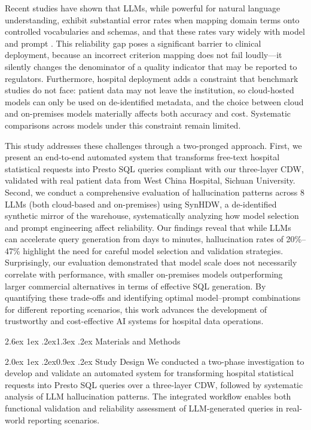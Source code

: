\documentclass[10pt]{article}
\makeatletter
\renewcommand\section{\@startsection{section}{1}{\z@}%
  {2.6ex \@plus 1ex \@minus .2ex}{1.3ex \@plus .2ex}%
  {\normalfont\large\bfseries}}
\renewcommand\subsection{\@startsection{subsection}{2}{\z@}%
  {2.0ex \@plus 1ex \@minus .2ex}{0.9ex \@plus .2ex}%
  {\normalfont\normalsize\bfseries}}
\makeatother
\begin{document}
Recent studies have shown that LLMs, while powerful for natural language
understanding, exhibit substantial error rates when mapping domain terms onto
controlled vocabularies and schemas, and that these rates vary widely with model
and prompt \cite{halluc2024,ragstruct2024,chang2024}. This reliability gap poses a significant barrier to
clinical deployment, because an incorrect criterion mapping does not fail
loudly---it silently changes the denominator of a quality indicator that may be
reported to regulators. Furthermore, hospital deployment adds a constraint that
benchmark studies do not face: patient data may not leave the institution, so
cloud-hosted models can only be used on de-identified metadata, and the choice
between cloud and on-premises models materially affects both accuracy and cost.
Systematic comparisons across models under this constraint remain limited.

This study addresses these challenges through a two-pronged approach. First, we
present an end-to-end automated system that transforms free-text hospital
statistical requests into Presto SQL queries compliant with our three-layer CDW,
validated with real patient data from West China Hospital, Sichuan University. Second, we conduct a
comprehensive evaluation of hallucination patterns across 8 LLMs (both
cloud-based and on-premises) using SynHDW, a de-identified synthetic mirror of
the warehouse, systematically analyzing how model selection and prompt
engineering affect reliability. Our findings reveal that while LLMs can
accelerate query generation from days to minutes, hallucination rates of
20\%--47\% highlight the need for careful model selection and validation
strategies. Surprisingly, our evaluation demonstrated that model scale does not
necessarily correlate with performance, with smaller on-premises models
outperforming larger commercial alternatives in terms of effective SQL
generation. By quantifying these trade-offs and identifying optimal
model--prompt combinations for different reporting scenarios, this work advances
the development of trustworthy and cost-effective AI systems for hospital data
operations.

\section{Materials and Methods}

\subsection{Study Design}
We conducted a two-phase investigation to develop and validate an automated
system for transforming hospital statistical requests into Presto SQL queries
over a three-layer CDW, followed by systematic analysis of LLM hallucination
patterns. The integrated workflow enables both functional validation and
reliability assessment of LLM-generated queries in real-world reporting
scenarios.
\end{document}

